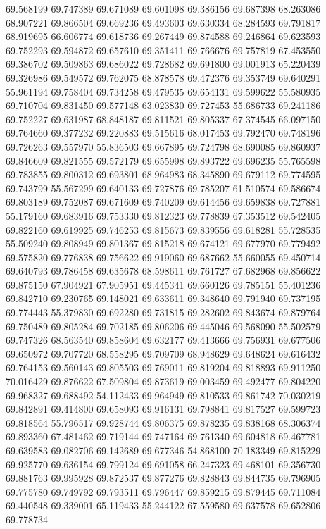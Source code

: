 69.568199
69.747389
69.671089
69.601098
69.386156
69.687398
68.263086
68.907221
69.866504
69.669236
69.493603
69.630334
68.284593
69.791817
68.919695
66.606774
69.618736
69.267449
69.874588
69.246864
69.623593
69.752293
69.594872
69.657610
69.351411
69.766676
69.757819
67.453550
69.386702
69.509863
69.686022
69.728682
69.691800
69.001913
65.220439
69.326986
69.549572
69.762075
68.878578
69.472376
69.353749
69.640291
55.961194
69.758404
69.734258
69.479535
69.654131
69.599622
55.580935
69.710704
69.831450
69.577148
63.023830
69.727453
55.686733
69.241186
69.752227
69.631987
68.848187
69.811521
69.805337
67.374545
66.097150
69.764660
69.377232
69.220883
69.515616
68.017453
69.792470
69.748196
69.726263
69.557970
55.836503
69.667895
69.724798
68.690085
69.860937
69.846609
69.821555
69.572179
69.655998
69.893722
69.696235
55.765598
69.783855
69.800312
69.693801
68.964983
68.345890
69.679112
69.774595
69.743799
55.567299
69.640133
69.727876
69.785207
61.510574
69.586674
69.803189
69.752087
69.671609
69.740209
69.614456
69.659838
69.727881
55.179160
69.683916
69.753330
69.812323
69.778839
67.353512
69.542405
69.822160
69.619925
69.746253
69.815673
69.839556
69.618281
55.728535
55.509240
69.808949
69.801367
69.815218
69.674121
69.677970
69.779492
69.575820
69.776838
69.756622
69.919060
69.687662
55.660055
69.450714
69.640793
69.786458
69.635678
68.598611
69.761727
67.682968
69.856622
69.875150
67.904921
67.905951
69.445341
69.660126
69.785151
55.401236
69.842710
69.230765
69.148021
69.633611
69.348640
69.791940
69.737195
69.774443
55.379830
69.692280
69.731815
69.282602
69.843674
69.879764
69.750489
69.805284
69.702185
69.806206
69.445046
69.568090
55.502579
69.747326
68.563540
69.858604
69.632177
69.413666
69.756931
69.677506
69.650972
69.707720
68.558295
69.709709
68.948629
69.648624
69.616432
69.764153
69.560143
69.805503
69.769011
69.819204
69.818893
69.911250
70.016429
69.876622
67.509804
69.873619
69.003459
69.492477
69.804220
69.968327
69.688492
54.112433
69.964949
69.810533
69.861742
70.030219
69.842891
69.414800
69.658093
69.916131
69.798841
69.817527
69.599723
69.818564
55.796517
69.928744
69.806375
69.878235
69.838168
68.306374
69.893360
67.481462
69.719144
69.747164
69.761340
69.604818
69.467781
69.639583
69.082706
69.142689
69.677346
54.868100
70.183349
69.815229
69.925770
69.636154
69.799124
69.691058
66.247323
69.468101
69.356730
69.881763
69.995928
69.872537
69.877276
69.828843
69.844735
69.796905
69.775780
69.749792
69.793511
69.796447
69.859215
69.879445
69.711084
69.440548
69.339001
65.119433
55.244122
67.559580
69.637578
69.652806
69.778734
